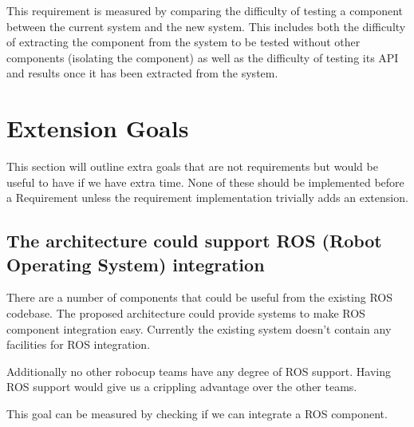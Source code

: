 \documentclass[english,12pt]{scrartcl}
\begin{document}
			This requirement is measured by comparing the difficulty of testing a component between
			the current system and the new system. This includes both the difficulty of extracting
			the component from the system to be tested without other components (isolating the
			component) as well as the difficulty of testing its API and results once it has been
			extracted from the system.

	\section{Extension Goals}
		This section will outline extra goals that are not requirements but would be useful to have
		if we have extra time. None of these should be implemented before a Requirement unless the
		requirement implementation trivially adds an extension.

		\subsection{The architecture could support ROS (Robot Operating System) integration}
			There are a number of components that could be useful from the existing ROS codebase.
			The proposed architecture could provide systems to make ROS component integration easy.
			Currently the existing system doesn't contain any facilities for ROS integration.

			Additionally no other \gls{robocup} teams have any degree of ROS support. Having ROS support
			would give us a crippling advantage over the other teams.

			This goal can be measured by checking if we can integrate a ROS component.

	
	
	
	\printglossaries
\end{document}
